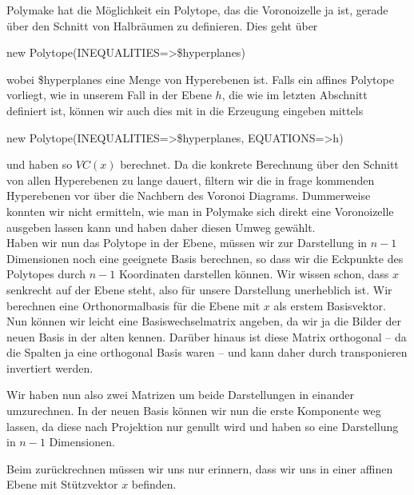          Polymake hat die Möglichkeit ein Polytope, das die Voronoizelle ja ist, gerade über den Schnitt von Halbräumen zu definieren. Dies geht über

         \begin{code}
            new Polytope(INEQUALITIES=>\$hyperplanes)
         \end{code}

         wobei \$hyperplanes eine Menge von Hyperebenen ist. Falls ein affines Polytope vorliegt, wie in unserem Fall in der Ebene $h$, die wie im letzten Abschnitt
         definiert ist, können wir auch dies mit in die Erzeugung eingeben mittels

         \begin{code}
            new Polytope(INEQUALITIES=>\$hyperplanes, EQUATIONS=>{h})
         \end{code}

         und haben so $VC(x)$ berechnet. Da die konkrete Berechnung über den Schnitt von allen Hyperebenen zu lange dauert, filtern wir die in frage kommenden Hyperebenen vor
         über die Nachbern des Voronoi Diagrams. Dummerweise konnten wir nicht ermitteln, wie man in Polymake sich direkt eine Voronoizelle ausgeben lassen kann und
         haben daher diesen Umweg gewählt.\\

         Haben wir nun das Polytope in der Ebene, müssen wir zur Darstellung in $n-1$ Dimensionen noch eine geeignete Basis berechnen, so dass wir
         die Eckpunkte des Polytopes durch $n-1$ Koordinaten darstellen können. Wir wissen schon, dass $x$ senkrecht auf der Ebene steht, also für unsere Darstellung 
         unerheblich ist. Wir berechnen eine Orthonormalbasis für die Ebene mit $x$ als erstem Basisvektor. Nun können wir leicht eine Basiswechselmatrix angeben,
         da wir ja die Bilder der neuen Basis in der alten kennen. Darüber hinaus ist diese Matrix orthogonal -- da die Spalten ja eine orthogonal Basis waren -- und
         kann daher durch transponieren invertiert werden.

         Wir haben nun also zwei Matrizen um beide Darstellungen in einander umzurechnen. In der neuen Basis können wir nun die erste Komponente weg lassen,
         da diese nach Projektion nur genullt wird und haben so eine Darstellung in $n-1$ Dimensionen.

         Beim zurückrechnen müssen wir uns nur erinnern, dass wir uns in einer affinen Ebene mit Stützvektor $x$ befinden.

